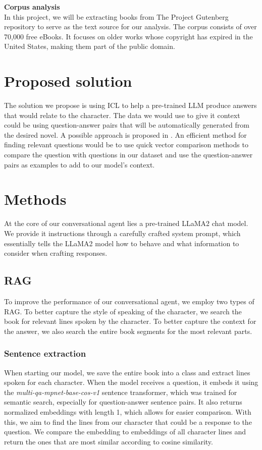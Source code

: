 \documentclass[fleqn,moreauthors,10pt]{ds_report}
\begin{document}
\textbf{Corpus analysis} \\
In this project, we will be extracting books from The Project Gutenberg repository \cite{gutenberg} to serve as the text source for our analysis. The corpus consists of over 70,000 free eBooks. It focuses on older works whose copyright has expired in the United States, making them part of the public domain.

\section{Proposed solution}
The solution we propose is using ICL to help a pre-trained LLM produce answers that would relate to the character. The data we would use to give it context could be using question-answer pairs that will be automatically generated from the desired novel. A possible approach is proposed in \cite{mo_2023}. An efficient method for finding relevant questions would be to use quick vector comparison methods to compare the question with questions in our dataset and use the question-answer pairs as examples to add to our model's context.

\section{Methods}
At the core of our conversational agent lies a pre-trained LLaMA2 chat model. We provide it instructions through a carefully crafted system prompt, which essentially tells the LLaMA2 model how to behave and what information to consider when crafting responses.
\subsection{RAG}
To improve the performance of our conversational agent, we employ two types of RAG. To better capture the style of speaking of the character, we search the book for relevant lines spoken by the character. To better capture the context for the answer, we also search the entire book segments for the most relevant parts.
\subsubsection*{Sentence extraction}
When starting our model, we save the entire book into a class and extract lines spoken for each character. When the model receives a question, it embeds it using the \textit{multi-qa-mpnet-base-cos-v1} sentence transformer, which was trained for semantic search, especially for question-answer sentence pairs. It also returns normalized embeddings with length 1, which allows for easier comparison. With this, we aim to find the lines from our character that could be a response to the question. We compare the embedding to embeddings of all character lines and return the ones that are most similar according to cosine similarity.
\end{document}
